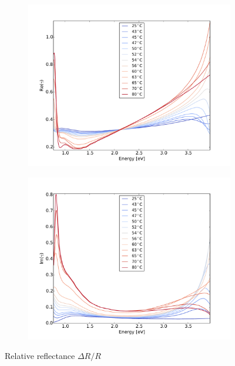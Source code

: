 \begin{figure}
    \begin{subfigure}[b]{0.49\textwidth}
        \centering
        \includegraphics[width=\textwidth]{Results/Sim2/re_gamma.pdf}
        \caption{}
        \label{fig:2}
    \end{subfigure}
    \begin{subfigure}[b]{0.49\textwidth}
        \centering
        \includegraphics[width=\textwidth]{Results/Sim2/im_gamma.pdf}
        \caption{}
        \label{fig:2}
    \end{subfigure}
    \caption{Relative reflectance $\Delta R/R$}
    \label{fig:}
\end{figure}
